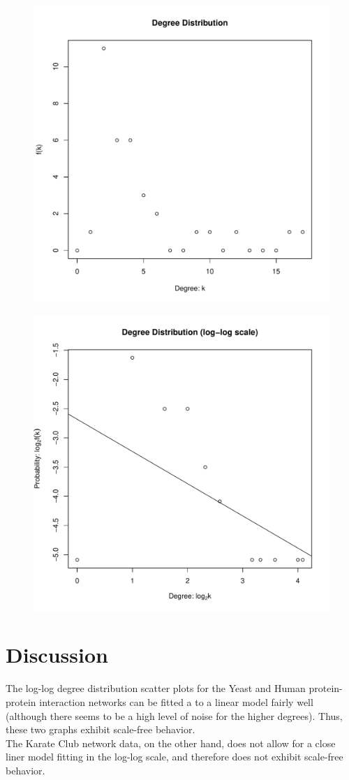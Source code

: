 \documentclass{report}
\begin{document}
\begin{figure}[htp!]
  \centering
  \includegraphics[width=0.65\linewidth]{karate}
\end{figure}
\vspace{-2em}
\begin{figure}[htp!]
  \centering
  \includegraphics[width=0.65\linewidth]{karateLog}
\end{figure}

\newpage

\section*{Discussion}

The log-log degree distribution scatter plots for the Yeast and Human protein-protein interaction networks can be fitted a to a linear model fairly well (although there seems to be a high level of noise for the higher degrees). Thus, these two graphs exhibit scale-free behavior.\\

The Karate Club network data, on the other hand, does not allow for a close liner model fitting in the log-log scale, and therefore does not exhibit scale-free behavior.
\end{document}
